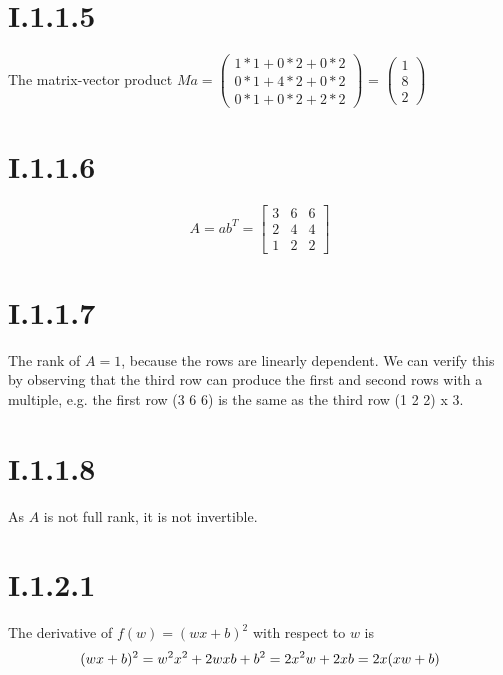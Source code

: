 \section*{I.1.1.5}
The matrix-vector product $Ma = \begin{pmatrix}
                                 1*1 + 0*2 + 0*2 \\
                                 0*1 + 4*2 + 0*2 \\
                                 0*1 + 0*2 + 2*2
                                \end{pmatrix}$
                              = $\begin{pmatrix}
                                 1 \\
                                 8 \\
                                 2
                                \end{pmatrix}$

\section*{I.1.1.6}
\[
	A = ab^T = \begin{bmatrix}
		3 & 6 & 6 \\
		2 & 4 & 4 \\
		1 & 2 & 2
	\end{bmatrix}
\]

\section*{I.1.1.7}
The rank of $A = 1$, because the rows are linearly dependent. We can verify this
by observing that the third row can produce the first and second rows with a
multiple, e.g. the first row (3 6 6) is the same as the third row (1 2 2) x 3.

\section*{I.1.1.8}
As $A$ is not full rank, it is not invertible.

\section*{I.1.2.1}
The derivative of $f(w) = (wx + b)^2$ with respect to $w$ is
\[
	(wx+b)^2 = w^2 x^2 + 2wxb+b^2 = \\
	2x^2w + 2xb = \\
	2x(xw + b)
\]

